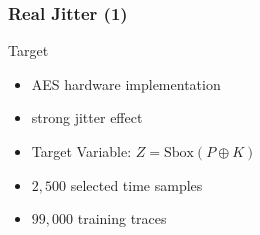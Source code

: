 %



\begin{frame}
\frametitle{Real Jitter (1)}
\vspace{-10pt}
\begin{block}{Target}
\begin{itemize}
\item AES hardware implementation
\item strong jitter effect
\item Target Variable: $Z = \mathrm{Sbox}(P\oplus K)$
\item $2,500$ selected time samples
\item $99,000$ training traces
\end{itemize}
\end{block}




\end{frame}

